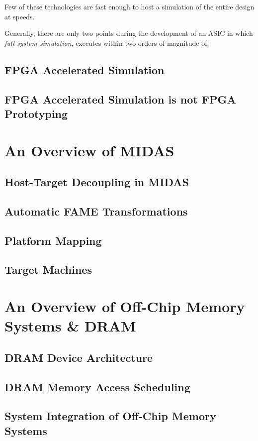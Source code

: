 Few of these technologies are fast enough to host a simulation of the entire
design at speeds.

Generally, there are only two points during the development of an ASIC in which
\textit{full-system simulation}, executes within two orders of magnitude of.

\subsection{FPGA Accelerated Simulation}

\subsection{FPGA Accelerated Simulation is not FPGA Prototyping}

\section{An Overview of MIDAS}

\subsection{Host-Target Decoupling in MIDAS}

\subsection{Automatic FAME Transformations}

\subsection{Platform Mapping}

\subsection{Target Machines}

\section{An Overview of Off-Chip Memory Systems \& DRAM}

\subsection{DRAM Device Architecture}


\subsection{DRAM Memory Access Scheduling}


\subsection{System Integration of Off-Chip Memory Systems}
